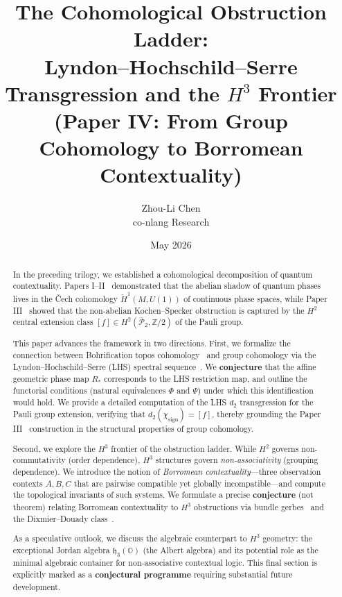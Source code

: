 \documentclass[11pt]{article}
\title{The Cohomological Obstruction Ladder:\\
Lyndon--Hochschild--Serre Transgression and the $H^3$ Frontier\\
{\large (Paper IV: From Group Cohomology to Borromean Contextuality)}}
\author{Zhou-Li Chen \\ co-nlang Research}
\date{May 2026}
\begin{document}
\maketitle

\begin{abstract}
In the preceding trilogy, we established a cohomological decomposition of quantum contextuality. Papers I--II~\cite{PaperI,PaperII} demonstrated that the abelian shadow of quantum phases lives in the \v{C}ech cohomology $\check{H}^1(M, U(1))$ of continuous phase spaces, while Paper III~\cite{PaperIII} showed that the non-abelian Kochen--Specker obstruction is captured by the $H^2$ central extension class $[f] \in H^2(\bar{\mathcal{P}}_2, \mathbb{Z}/2)$ of the Pauli group.

This paper advances the framework in two directions. First, we formalize the connection between Bohrification topos cohomology~\cite{HLS11} and group cohomology via the Lyndon--Hochschild--Serre (LHS) spectral sequence~\cite{HS53}. We \textbf{conjecture} that the affine geometric phase map $R_*$ corresponds to the LHS restriction map, and outline the functorial conditions (natural equivalences $\Phi$ and $\Psi$) under which this identification would hold. We provide a detailed computation of the LHS $d_2$ transgression for the Pauli group extension, verifying that $d_2(\chi_{\text{sign}}) = [f]$, thereby grounding the Paper III~\cite{PaperIII} construction in the structural properties of group cohomology.

Second, we explore the $H^3$ frontier of the obstruction ladder. While $H^2$ governs non-commutativity (order dependence), $H^3$ structures govern \emph{non-associativity} (grouping dependence). We introduce the notion of \emph{Borromean contextuality}---three observation contexts $A, B, C$ that are pairwise compatible yet globally incompatible---and compute the topological invariants of such systems. We formulate a precise \textbf{conjecture} (not theorem) relating Borromean contextuality to $H^3$ obstructions via bundle gerbes~\cite{Murray96,Brylinski93} and the Dixmier--Douady class~\cite{DD63}.

As a speculative outlook, we discuss the algebraic counterpart to $H^3$ geometry: the exceptional Jordan algebra $\mathfrak{h}_3(\mathbb{O})$ (the Albert algebra) and its potential role as the minimal algebraic container for non-associative contextual logic. This final section is explicitly marked as a \textbf{conjectural programme} requiring substantial future development.
\end{abstract}
\end{document}
